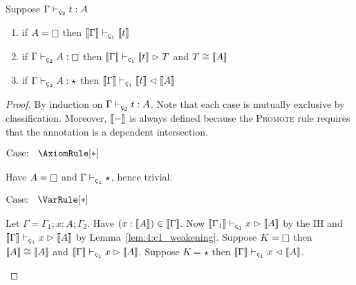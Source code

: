 \begin{theorem}
    \label{lem:4:soudness}
    Suppose $\Gamma \vdash_{\ced} t : A$
    \begin{enumerate}
        \item if $A = \kind$ then $\sema{\Gamma} \vdash_{\oldced} \sema{t}$
        \item if $\Gamma \vdash_{\ced} A : \kind$ then $\sema{\Gamma} \vdash_{\oldced} \sema{t} \infr T$ and $T \cong \llbracket A \rrbracket$
        \item if $\Gamma \vdash_{\ced} A : \star$ then $\sema{\Gamma} \vdash_{\oldced} \sema{t} \chck \sema{A}$
    \end{enumerate}
\end{theorem}
\begin{proof}
    By induction on $\Gamma \vdash_{\ced} t : A$.
    Note that each case is mutually exclusive by classification.
    Moreover, $\llbracket - \rrbracket$ is always defined because the \textsc{Promote} rule requires that the annotation is a dependent intersection.

    $\text{Case: }\begin{array}{c} \AxiomRule[*] \end{array}$
    \begin{proofcase}
        Have $A = \kind$ and $\Gamma \vdash_{\oldced} \star$, hence trivial.
    \end{proofcase}

    $\text{Case: }\begin{array}{c} \VarRule[*] \end{array}$
    \begin{proofcase}
        Let $\Gamma = \Gamma_1; x : A; \Gamma_2$.
        Have $(x : \llbracket A \rrbracket) \in \llbracket \Gamma \rrbracket$.
        Now $\sema{\Gamma_1} \vdash_{\oldced} x \infr \sema{A}$ by the IH and $\sema{\Gamma} \vdash_{\oldced} x \infr \sema{A}$ by Lemma~\ref{lem:4:c1_weakening}.
        Suppose $K = \kind$ then $\llbracket A \rrbracket \cong \llbracket A \rrbracket$ and $\sema{\Gamma} \vdash_{\oldced} x \infr \sema{A}$.
        Suppose $K = \star$ then $\sema{\Gamma} \vdash_{\oldced} x \chck \sema{A}$.
    \end{proofcase}


\end{proof}
